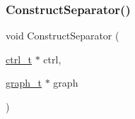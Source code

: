 \mbox{\label{a00272_a8da060cb6f592f66c7eb2e31af3ecba5}} 
\subsubsection{\texorpdfstring{Construct\+Separator()}{ConstructSeparator()}}
{\footnotesize\ttfamily void Construct\+Separator (\begin{DoxyParamCaption}\item[{\hyperlink{a00742}{ctrl\+\_\+t} $\ast$}]{ctrl,  }\item[{\hyperlink{a00734}{graph\+\_\+t} $\ast$}]{graph }\end{DoxyParamCaption})}

